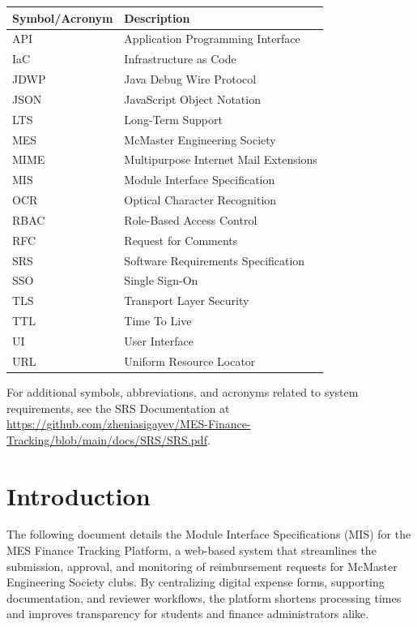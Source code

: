 \documentclass[12pt, titlepage]{article}
\begin{document}
\begin{center}
\renewcommand{\arraystretch}{1.2}
\begin{tabular}{l l}
\toprule
\textbf{Symbol/Acronym} & \textbf{Description} \\
\midrule
API & Application Programming Interface \\
IaC & Infrastructure as Code \\
JDWP & Java Debug Wire Protocol \\
JSON & JavaScript Object Notation \\
LTS & Long-Term Support \\
MES & McMaster Engineering Society \\
MIME & Multipurpose Internet Mail Extensions \\
MIS & Module Interface Specification \\
OCR & Optical Character Recognition \\
RBAC & Role-Based Access Control \\
RFC & Request for Comments \\
SRS & Software Requirements Specification \\
SSO & Single Sign-On \\
TLS & Transport Layer Security \\
TTL & Time To Live \\
UI & User Interface \\
URL & Uniform Resource Locator \\
\bottomrule
\end{tabular}
\end{center}

For additional symbols, abbreviations, and acronyms related to system requirements, see the SRS Documentation at \url{https://github.com/zheniasigayev/MES-Finance-Tracking/blob/main/docs/SRS/SRS.pdf}.

\newpage

\tableofcontents

\newpage


\section{Introduction}

The following document details the Module Interface Specifications (MIS) for the MES Finance Tracking Platform, a web-based system that streamlines the submission, approval, and monitoring of reimbursement requests for McMaster Engineering Society clubs. By centralizing digital expense forms, supporting documentation, and reviewer workflows, the platform shortens processing times and improves transparency for students and finance administrators alike.
\end{document}
